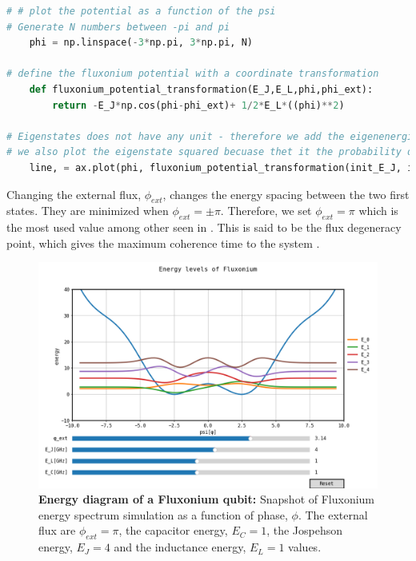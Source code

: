     \begin{lstlisting}[language = Python]
# # plot the potential as a function of the psi
# Generate N numbers between -pi and pi
    phi = np.linspace(-3*np.pi, 3*np.pi, N)
    
# define the fluxonium potential with a coordinate transformation
    def fluxonium_potential_transformation(E_J,E_L,phi,phi_ext):
        return -E_J*np.cos(phi-phi_ext)+ 1/2*E_L*((phi)**2)
    
# Eigenstates does not have any unit - therefore we add the eigenenergies
# we also plot the eigenstate squared becuase thet it the probability distribution. 
    line, = ax.plot(phi, fluxonium_potential_transformation(init_E_J, init_E_L,phi, init_phi_ext))
    \end{lstlisting}
    Changing the external flux, $\phi_{ext}$, changes the energy spacing between the two first states. They are minimized when  $\phi_{ext} = \pm \pi$. Therefore, we set $\phi_{ext} = \pi$ which is the most used value among other seen in \cite{Nguyen2022}. This is said to be the flux degeneracy point, which gives the maximum coherence time to the system \cite{Krantz2019}.  
    \begin{figure}
        \centering
        \includegraphics[width = 13.5cm]{Images/Wavefunctions_and_eigenstates_Fluxonium.png}
        \caption[Energy diagram of a Fluxonium qubit]{\textbf{Energy diagram of a Fluxonium qubit:} Snapshot of Fluxonium energy spectrum simulation as a function of phase, $\phi$. The external flux are $\phi_{ext} = \pi$, the capacitor energy, $E_C= 1$, the Jospehson energy, $E_J = 4$ and the inductance energy, $E_L = 1$ values.}
        \label{fig:Energy_Fluxonium}
    \end{figure}

